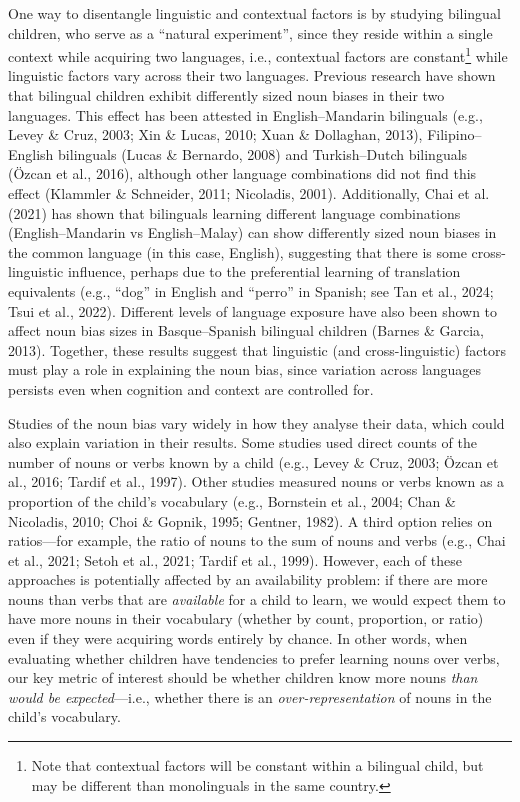 \documentclass[10pt, letterpaper]{article}
\begin{document}
One way to disentangle linguistic and contextual factors is by studying
bilingual children, who serve as a ``natural experiment'', since they
reside within a single context while acquiring two languages, i.e.,
contextual factors are constant\footnote{Note that contextual factors
  will be constant within a bilingual child, but may be different than
  monolinguals in the same country.} while linguistic factors vary
across their two languages. Previous research have shown that bilingual
children exhibit differently sized noun biases in their two languages.
This effect has been attested in English--Mandarin bilinguals (e.g.,
Levey \& Cruz, 2003; Xin \& Lucas, 2010; Xuan \& Dollaghan, 2013),
Filipino--English bilinguals (Lucas \& Bernardo, 2008) and
Turkish--Dutch bilinguals (Özcan et al., 2016), although other language
combinations did not find this effect (Klammler \& Schneider, 2011;
Nicoladis, 2001). Additionally, Chai et al. (2021) has shown that
bilinguals learning different language combinations (English--Mandarin
vs English--Malay) can show differently sized noun biases in the common
language (in this case, English), suggesting that there is some
cross-linguistic influence, perhaps due to the preferential learning of
translation equivalents (e.g., ``dog'' in English and ``perro'' in
Spanish; see Tan et al., 2024; Tsui et al., 2022). Different levels of
language exposure have also been shown to affect noun bias sizes in
Basque--Spanish bilingual children (Barnes \& Garcia, 2013). Together,
these results suggest that linguistic (and cross-linguistic) factors
must play a role in explaining the noun bias, since variation across
languages persists even when cognition and context are controlled for.

Studies of the noun bias vary widely in how they analyse their data,
which could also explain variation in their results. Some studies used
direct counts of the number of nouns or verbs known by a child (e.g.,
Levey \& Cruz, 2003; Özcan et al., 2016; Tardif et al., 1997). Other
studies measured nouns or verbs known as a proportion of the child's
vocabulary (e.g., Bornstein et al., 2004; Chan \& Nicoladis, 2010; Choi
\& Gopnik, 1995; Gentner, 1982). A third option relies on ratios---for
example, the ratio of nouns to the sum of nouns and verbs (e.g., Chai et
al., 2021; Setoh et al., 2021; Tardif et al., 1999). However, each of
these approaches is potentially affected by an availability problem: if
there are more nouns than verbs that are \emph{available} for a child to
learn, we would expect them to have more nouns in their vocabulary
(whether by count, proportion, or ratio) even if they were acquiring
words entirely by chance. In other words, when evaluating whether
children have tendencies to prefer learning nouns over verbs, our key
metric of interest should be whether children know more nouns \emph{than
would be expected}---i.e., whether there is an
\emph{over-representation} of nouns in the child's vocabulary.
\end{document}
